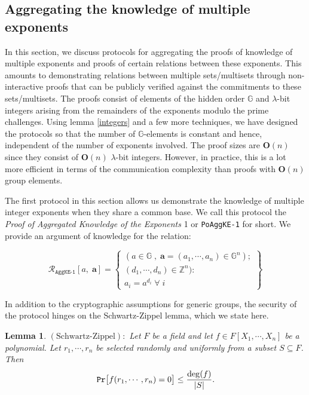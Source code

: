 \documentclass[11pt, lettersize, notitlepage, leqno, footskip=0.6cm]{article}
\newcommand{\bz}{\mathbb Z}
\newcommand{\ttt}{\texttt}
\newcommand{\mc}{\mathcal}
\newcommand{\mb}{\mathbb}
\newcommand{\mbf}{\mathbf}
\newcommand{\mr}{\mathrm}
\newcommand{\lam}{\lambda}
\newcommand{\sub}{\subseteq}
\newcommand{\bO}{\mbf{O}}
\newcommand{\vs}{\vspace{-0.15cm}}
\newcommand{\noin}{\noindent}
\newtheorem{Lem}[Thm]{Lemma}
\numberwithin{equation}{section}
\begin{document}






\subsection{\fontsize{11}{11}\selectfont Aggregating the knowledge of multiple exponents}

In this section, we discuss protocols for aggregating the proofs of knowledge of multiple exponents and proofs of certain relations between these exponents. This amounts to demonstrating relations between multiple sets/multisets through non-interactive proofs that can be publicly verified against the commitments to these sets/multisets. The proofs consist of elements of the hidden order $\mb{G}$ and $\lam$-bit integers arising from the remainders of the exponents modulo the prime challenges. Using lemma \ref{integers} and a few more techniques, we have designed the protocols so that the number of $\mb{G}$-elements is constant and hence, independent of the number of exponents involved. The proof sizes are $\bO(n)$ since they consist of $\bO(n)$ $\lam$-bit integers. However, in practice, this is a lot more efficient in terms of the communication complexity than proofs with $\bO(n)$ group elements.

The first protocol in this section allows us demonstrate the knowledge of multiple integer exponents when they share a common base. We call this protocol the \textit{Proof of Aggregated Knowledge of the Exponents} 1 or \verb|PoAggKE-1| for short. We provide an argument of knowledge for the relation: \vs

\[
  \mc{R}_{{\ttt{AggKE-1}}}[a,\; \mbf{a}] = \left\{\begin{array}{l}
    (a\in\mb{G}\;,\; \mbf{a} = (a_1,\cdots, a_n)\in\mb{G}^n);\\ 
    (d_1,\cdots,d_n)\in\bz^n):  \\
    a_i = a^{d_i}\;\forall\; i
  \end{array}\right\}
\]

\noin In addition to the cryptographic assumptions for generic groups, the security of the protocol hinges on the Schwartz-Zippel lemma, which we state here.

\begin{Lem} $\mr{(Schwartz\text{-}Zippel)}:$ Let $F$ be a field and let $f\in F[X_1,\cdots,X_n]$ be a polynomial. Let $r_1,\cdots,r_n$ be selected randomly and uniformly from a subset $S\sub F$. Then \vs $${\tt{Pr}}\big[f(r_1,\cdots, r_n) = 0\big] \leq \frac{\deg(f)}{|S|}.$$\end{Lem}
\end{document}

